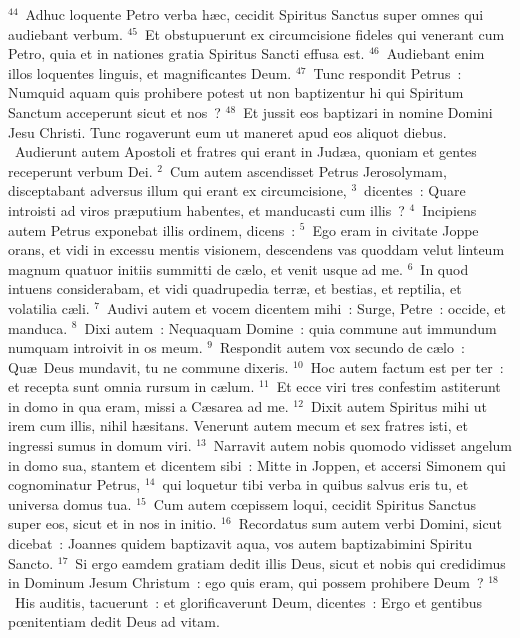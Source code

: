 ${}^{44}$~Adhuc loquente Petro verba h\ae c, cecidit Spiritus Sanctus super omnes qui audiebant verbum.
${}^{45}$~Et obstupuerunt ex circumcisione fideles qui venerant cum Petro, quia et in nationes gratia Spiritus Sancti effusa est.
${}^{46}$~Audiebant enim illos loquentes linguis, et magnificantes Deum.
${}^{47}$~Tunc respondit Petrus~: Numquid aquam quis prohibere potest ut non baptizentur hi qui Spiritum Sanctum acceperunt sicut et nos~?
${}^{48}$~Et jussit eos baptizari in nomine Domini Jesu Christi. Tunc rogaverunt eum ut maneret apud eos aliquot diebus.
~Audierunt autem Apostoli et fratres qui erant in Jud\ae a, quoniam et gentes receperunt verbum Dei.
${}^{2}$~Cum autem ascendisset Petrus Jerosolymam, disceptabant adversus illum qui erant ex circumcisione,
${}^{3}$~dicentes~: Quare introisti ad viros pr\ae putium habentes, et manducasti cum illis~?
${}^{4}$~Incipiens autem Petrus exponebat illis ordinem, dicens~:
${}^{5}$~Ego eram in civitate Joppe orans, et vidi in excessu mentis visionem, descendens vas quoddam velut linteum magnum quatuor initiis summitti de c\ae lo, et venit usque ad me.
${}^{6}$~In quod intuens considerabam, et vidi quadrupedia terr\ae , et bestias, et reptilia, et volatilia c\ae li.
${}^{7}$~Audivi autem et vocem dicentem mihi~: Surge, Petre~: occide, et manduca.
${}^{8}$~Dixi autem~: Nequaquam Domine~: quia commune aut immundum numquam introivit in os meum.
${}^{9}$~Respondit autem vox secundo de c\ae lo~: Qu\ae\ Deus mundavit, tu ne commune dixeris.
${}^{10}$~Hoc autem factum est per ter~: et recepta sunt omnia rursum in c\ae lum.
${}^{11}$~Et ecce viri tres confestim astiterunt in domo in qua eram, missi a C\ae sarea ad me.
${}^{12}$~Dixit autem Spiritus mihi ut irem cum illis, nihil h\ae sitans. Venerunt autem mecum et sex fratres isti, et ingressi sumus in domum viri.
${}^{13}$~Narravit autem nobis quomodo vidisset angelum in domo sua, stantem et dicentem sibi~: Mitte in Joppen, et accersi Simonem qui cognominatur Petrus,
${}^{14}$~qui loquetur tibi verba in quibus salvus eris tu, et universa domus tua.
${}^{15}$~Cum autem cœpissem loqui, cecidit Spiritus Sanctus super eos, sicut et in nos in initio.
${}^{16}$~Recordatus sum autem verbi Domini, sicut dicebat~: Joannes quidem baptizavit aqua, vos autem baptizabimini Spiritu Sancto.
${}^{17}$~Si ergo eamdem gratiam dedit illis Deus, sicut et nobis qui credidimus in Dominum Jesum Christum~: ego quis eram, qui possem prohibere Deum~?
${}^{18}$~His auditis, tacuerunt~: et glorificaverunt Deum, dicentes~: Ergo et gentibus pœnitentiam dedit Deus ad vitam.


